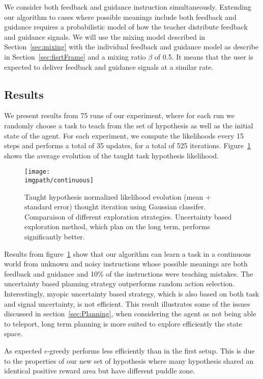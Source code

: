 We consider both feedback and guidance instruction simultaneously. Extending our algorithm to cases where possible meanings include both feedback and guidance requires a probabilistic model of how the teacher distribute feedback and guidance signals. We will use the mixing model described in Section~\ref{sec:mixing} with the individual feedback and guidance model as describe in Section~\ref{sec:fisrtFrame} and a mixing ratio $\beta$ of 0.5. It means that the user is expected to deliver feedback and guidance signals at a similar rate.


\subsection{Results}

We present results from 75 runs of our experiment, where for each run we randomly choose a task to teach from the set of hypothesis as well as the initial state of the agent. For each experiment, we compute the likelihoods every 15 steps and performs a total of 35 updates, for a total of 525 iterations. Figure~\ref{Rmax} shows the average evolution of the taught task hypothesis likelihood.

\begin{figure}[!htbp]
  \centering
  \texttt{[image: \\imgpath/continuous]}
  \caption{Taught hypothesis normalized likelihood evolution (mean + standard error) thought iteration using Gaussian classifer. Comparaison of different exploration strategies. Uncertainty based exploration method, which plan on the long term, performs significantly better.}
  \label{Rmax}
\end{figure}

Results from figure~\ref{Rmax} show that our algorithm can learn a task in a continuous world from unknown and noisy instructions whose possible meanings are both feedback and guidance and 10\% of the instructions were teaching mistakes. The uncertainty based planning strategy outperforms random action selection. Interestingly, myopic uncertainty based strategy, which is also based on both task and signal uncertainty, is not efficient. This result illustrates some of the issues discussed in section~\ref{sec:Planning}, when considering the agent as not being able to teleport, long term planning is more suited to explore efficiently the state space. 

As expected $\epsilon$-greedy performs less efficiently than in the first setup. This is due to the properties of our new set of hypothesis where many hypothesis shared an identical positive reward area but have different puddle zone.

